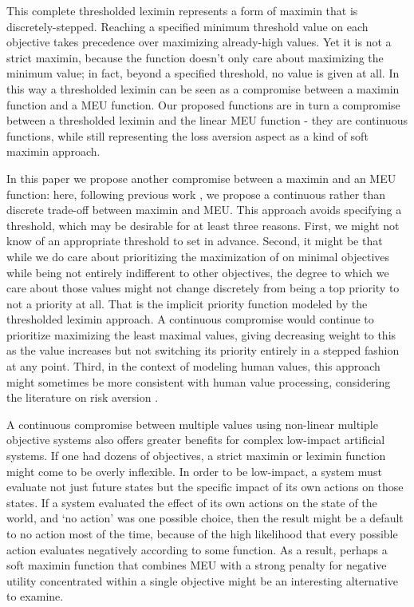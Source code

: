 This complete thresholded leximin represents a form of maximin that is discretely-stepped. Reaching a specified minimum threshold value on each objective takes precedence over maximizing already-high values. Yet it is not a strict maximin, because the function doesn't only care about maximizing the minimum value; in fact, beyond a specified threshold, no value is given at all. In this way a thresholded leximin can be seen as a compromise between a maximin function and a MEU function. Our proposed functions are in turn a compromise between a thresholded leximin and the linear MEU function - they are continuous functions, while still representing the loss aversion aspect as a kind of soft maximin approach.

In this paper we propose another compromise between a maximin and an MEU function: here, following previous work \cite{rolf_need_2020}, we propose a continuous rather than discrete trade-off between maximin and MEU. This approach avoids specifying a threshold, which may be desirable for at least three reasons. First, we might not know of an appropriate threshold to set in advance. Second, it might be that while we do care about prioritizing the maximization of on minimal objectives while being not entirely indifferent to other objectives, the degree to which we care about those values might not change discretely from being a top priority to not a priority at all. That is the implicit priority function modeled by the thresholded leximin approach. A continuous compromise would continue to prioritize maximizing the least maximal values, giving decreasing weight to this as the value increases but not switching its priority entirely in a stepped fashion at any point. Third, in the context of modeling human values, this approach might sometimes be more consistent with human value processing\cite{Tom515}, considering the literature on risk aversion \cite{pratt1978risk}.


A continuous compromise between multiple values using non-linear multiple objective systems also offers greater benefits for complex low-impact artificial systems. If one had dozens of objectives, a strict maximin or leximin function might come to be overly inflexible. In order to be low-impact, a system must evaluate not just future states but the specific impact of its own actions on those states. If a system evaluated the effect of its own actions on the state of the world, and `no action' was one possible choice, then the result might be a default to no action most of the time, because of the high likelihood that every possible action evaluates negatively according to some function. As a result, perhaps a soft maximin function that combines MEU with a strong penalty for negative utility concentrated within a single objective might be an interesting alternative to examine.

